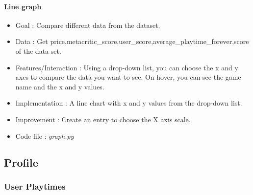 \documentclass{article}
\begin{document}
    \paragraph{Line graph}
    \begin{itemize}
        \item Goal : Compare different data from the dataset.
        \item Data : Get price,metacritic\_score,user\_score,average\_playtime\_forever,score of the data set.
        \item Features/Interaction : Using a drop-down list, you can choose the x and y axes to compare the data you want to see. On hover, you can see the game name and the x and y values.
        \item Implementation : A line chart with x and y values from the drop-down list.
        \item Improvement : Create an entry to choose the X axis scale.
        \item Code file : \textit{graph.py}
    \end{itemize}

	\subsection{Profile}
    
   	\subsubsection{User Playtimes}
\end{document}
